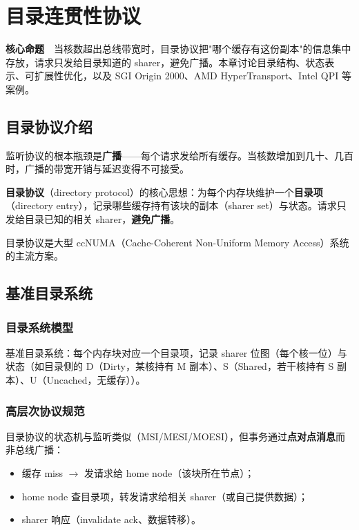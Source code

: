 \chapter{目录连贯性协议}

\begin{epigraph}
\textbf{核心命题}　当核数超出总线带宽时，目录协议把"哪个缓存有这份副本"的信息集中存放，请求只发给目录知道的 sharer，避免广播。本章讨论目录结构、状态表示、可扩展性优化，以及 SGI Origin 2000、AMD HyperTransport、Intel QPI 等案例。
\end{epigraph}



\section{目录协议介绍}

监听协议的根本瓶颈是\textbf{广播}——每个请求发给所有缓存。当核数增加到几十、几百时，广播的带宽开销与延迟变得不可接受。

\textbf{目录协议}（directory protocol）的核心思想：为每个内存块维护一个\textbf{目录项}（directory entry），记录哪些缓存持有该块的副本（sharer set）与状态。请求只发给目录已知的相关 sharer，\textbf{避免广播}。

目录协议是大型 ccNUMA（Cache-Coherent Non-Uniform Memory Access）系统的主流方案。

\section{基准目录系统}

\subsection{目录系统模型}

基准目录系统：每个内存块对应一个目录项，记录 sharer 位图（每个核一位）与状态（如目录侧的 D（Dirty，某核持有 M 副本）、S（Shared，若干核持有 S 副本）、U（Uncached，无缓存））。

\subsection{高层次协议规范}

目录协议的状态机与监听类似（MSI/MESI/MOESI），但事务通过\textbf{点对点消息}而非总线广播：

\begin{itemize}
\item 缓存 miss $\rightarrow$ 发请求给 home node（该块所在节点）；
\item home node 查目录项，转发请求给相关 sharer（或自己提供数据）；
\item sharer 响应（invalidate ack、数据转移）。
\end{itemize}



